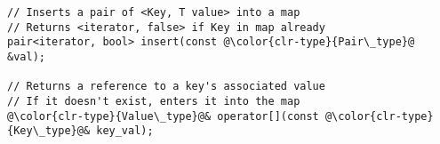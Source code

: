 \documentclass[7pt, twocolumn]{extarticle}
\newcommand{\myinline}[1]{\lstinline[basicstyle={\fontsize{5pt}{6}\ttfamily}]{#1}}
\begin{document}
\begin{small}
\begin{minipage}[h]{5.1cm}
\begin{tcolorbox}
{\begin{lstlisting}[style = mystyle,numbers=none]
// Inserts a pair of <Key, T value> into a map
// Returns <iterator, false> if Key in map already
pair<iterator, bool> insert(const @\color{clr-type}{Pair\_type}@ &val);

// Returns a reference to a key's associated value
// If it doesn't exist, enters it into the map
@\color{clr-type}{Value\_type}@& operator[](const @\color{clr-type}{Key\_type}@& key_val);
\end{lstlisting}
}
\end{tcolorbox} 




\end{minipage}
\end{small}
\end{document}
